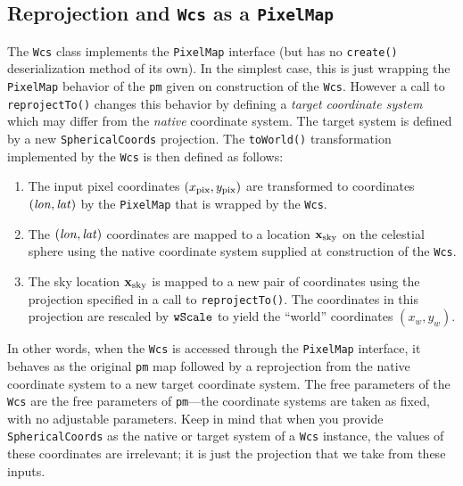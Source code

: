 \documentclass[11pt,preprint,flushrt]{aastex}
\begin{document}
\subsection{Reprojection and {\tt Wcs} as a {\tt PixelMap}}
The {\tt Wcs} class implements the {\tt PixelMap} interface (but has no \texttt{create()} deserialization method of its own). In the simplest case, this is just wrapping the {\tt PixelMap} behavior of the {\tt pm} given on construction of the {\tt Wcs}.  However a call to {\tt reprojectTo()} changes this behavior
 by defining a {\em target coordinate system} which may differ from the {\em native} coordinate system.  The target system is defined by a new \texttt{SphericalCoords} projection.
The {\tt toWorld()} transformation implemented by the {\tt Wcs} is then defined as follows:
\begin{enumerate}
\item The input pixel coordinates $(x_{\rm pix},y_{\rm pix})$ are transformed to coordinates $({\it lon},{\it lat})$ by the {\tt PixelMap} that is wrapped by the {\tt Wcs}.
\item The $({\it lon},{\it lat})$ coordinates are mapped to a location ${\bf x}_{\rm sky}$ on the celestial sphere using the native coordinate system supplied at construction of the {\tt Wcs}.
\item The sky location ${\bf x}_{\rm sky}$ is mapped to a new pair of coordinates using the projection specified in a call to {\tt reprojectTo()}.  The coordinates in this projection are rescaled by ${\tt wScale}$ to yield the ``world'' coordinates $(x_w,y_w)$.
\end{enumerate}
In other words, when the {\tt Wcs} is accessed through the {\tt PixelMap} interface, it behaves as the original {\tt pm} map followed by a reprojection from the native coordinate system to a new target coordinate system.  The free parameters of the {\tt Wcs} are the free parameters of {\tt pm}---the coordinate systems are taken as fixed, with no adjustable parameters.  Keep in mind that when you provide \texttt{SphericalCoords} as the native or target system of a \texttt{Wcs} instance, the values of these coordinates are irrelevant; it is just the projection that we take from these inputs.
\end{document}
